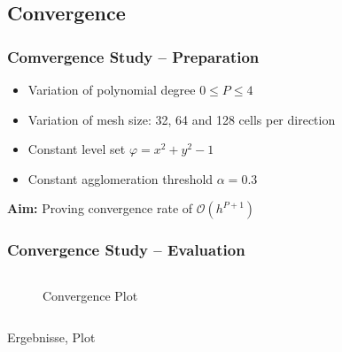 	\subsection{Convergence}
	\begin{frame}
		\frametitle{Comvergence Study -- Preparation}
		\begin{itemize}
			\item Variation of polynomial degree $ 0 \leq P \leq 4$
			\item Variation of mesh size: 32, 64 and 128 cells per direction
			\item Constant level set $\varphi  = x^2 + y^2 -1$
			\item Constant agglomeration threshold $\alpha = 0.3$
		\end{itemize}
		\vspace{0.5cm}
		\begin{center}
			\large
			\textbf{Aim:} Proving convergence rate of $\mathcal{O}(h^{P+1})$
		\end{center}
	\end{frame}
	\begin{frame}
		\frametitle{Convergence Study -- Evaluation}
		\begin{columns}[t]
			\column[]{4cm}
			\column[]{8cm}
		\begin{figure}[htp]
			\vspace{-1cm}
			\centering		
			
			\caption{Convergence Plot}
			\label{mesherror}
		\end{figure}
		\end{columns}
		Ergebnisse, Plot
	\end{frame}